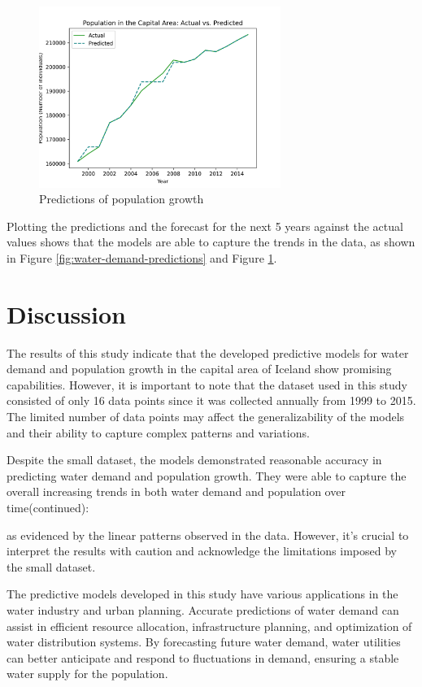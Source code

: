 \documentclass{article}
\begin{document}
\begin{figure}[!hb]
    \centering
    \includegraphics[width=0.7\textwidth]{../figures/population-hot-water-area-actual-vs-predicted.png}
    \caption{Predictions of population growth}
    \label{fig:population-predictions}
\end{figure}

Plotting the predictions and the forecast for the next 5 years against the actual values shows that the models are able to capture the trends in the data, as shown in Figure \ref{fig:water-demand-predictions} and Figure \ref{fig:population-predictions}.

\newpage

\section{Discussion}
The results of this study indicate that the developed predictive models for water demand and population growth in the capital area of Iceland show promising capabilities. However, it is important to note that the dataset used in this study consisted of only 16 data points since it was collected annually from 1999 to 2015. The limited number of data points may affect the generalizability of the models and their ability to capture complex patterns and variations.

Despite the small dataset, the models demonstrated reasonable accuracy in predicting water demand and population growth. They were able to capture the overall increasing trends in both water demand and population over time(continued):

as evidenced by the linear patterns observed in the data. However, it's crucial to interpret the results with caution and acknowledge the limitations imposed by the small dataset.

The predictive models developed in this study have various applications in the water industry and urban planning. Accurate predictions of water demand can assist in efficient resource allocation, infrastructure planning, and optimization of water distribution systems. By forecasting future water demand, water utilities can better anticipate and respond to fluctuations in demand, ensuring a stable water supply for the population.
\end{document}
